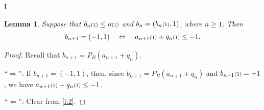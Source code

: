 I\documentclass[12pt]{article}
\newtheorem{lemma}[theorem]{Lemma}
\newcommand{\kkk}[1]{\ensuremath{\textstyle\mathsmaller{({#1})}}}
\begin{document}
\begin{lemma}
  \label{l:4}
Suppose that $b_n\kkk{1}\leq u\kkk{1}$ and $b_n=(b_n\kkk{1},1)$, 
where $n\geq 1$. 
Then
\begin{equation}
b_{n+1} = (-1,1)
\quad\Leftrightarrow\quad
a_{n+1}\kkk{1}+q_n\kkk{1} \leq -1.
\end{equation}
\end{lemma}
\begin{proof}
Recall that $b_{n+1} = P_B(a_{n+1}+q_n)$.

``$\Rightarrow$'':
If $b_{n+1} = (-1,1)$, 
then, 
since $b_{n+1}=P_B(a_{n+1}+q_n)$ 
and $b_{n+1}\kkk{1} =-1$, we have 
$a_{n+1}\kkk{1}+q_n\kkk{1}\leq -1$.

``$\Leftarrow$'':
Clear from \cref{l:2}.
\end{proof}
\end{document}
